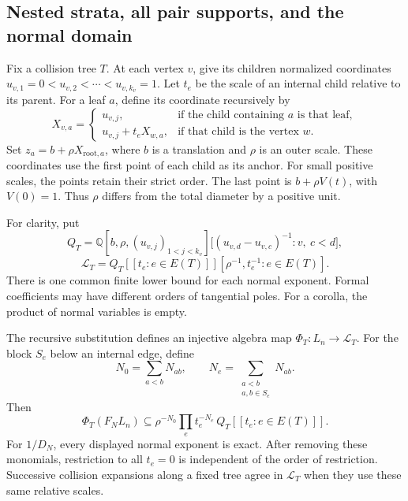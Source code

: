 \subsection{Nested strata, all pair supports, and the normal domain}
\label{gf:sec:gf-nested}

Fix a collision tree \(T\).  At each vertex \(v\), give its
children normalized coordinates
\(u_{v,1}=0<u_{v,2}<\cdots<u_{v,k_v}=1\).
Let \(t_e\) be the scale of an internal child relative to its parent.
For a leaf \(a\), define its coordinate recursively by
\[
 X_{v,a}=
 \begin{cases}
 u_{v,j},&\text{if the child containing }a\text{ is that leaf},\\
 u_{v,j}+t_eX_{w,a},&\text{if that child is the vertex }w.
 \end{cases}
\]
Set \(z_a=b+\rho X_{\mathrm{root},a}\), where \(b\) is a
translation and \(\rho\) is an outer scale.
These coordinates use the first point of each child as its anchor.
For small positive scales, the points retain their strict order.
The last point is \(b+\rho V(t)\), with \(V(0)=1\).
Thus \(\rho\) differs from the total diameter by a positive unit.

For clarity, put
\[
 Q_T=\mathbb Q[b,\rho,(u_{v,j})_{1<j<k_v}]
 \bigl[(u_{v,d}-u_{v,c})^{-1}:v,\ c<d\bigr],
\]
\begin{equation}\label{gf:eq:gf-domain}
 \mathscr L_T=
 Q_T[[t_e:e\in E(T)]][\rho^{-1},t_e^{-1}:e\in E(T)].
\end{equation}
There is one common finite lower bound for each normal exponent.
Formal coefficients may have different orders of tangential poles.
For a corolla, the product of normal variables is empty.

\begin{theorem}\label{gf:thm:gf-nested-poles}
The recursive substitution defines an injective algebra map
\(\Phi_T:L_n\to\mathscr L_T\).
For the block \(S_e\) below an internal edge, define
\[
 N_0=\sum_{a<b}N_{ab},\qquad
 N_e=\sum_{\substack{a<b\\a,b\in S_e}}N_{ab}.
\]
Then
\begin{equation}\label{gf:eq:gf-pole-bound}
 \Phi_T(F_NL_n)\subseteq
 \rho^{-N_0}\prod_e t_e^{-N_e}\,
 Q_T[[t_e:e\in E(T)]].
\end{equation}
For \(1/D_N\), every displayed normal exponent is exact.
After removing these monomials, restriction to all \(t_e=0\)
is independent of the order of restriction.
Successive collision expansions along a fixed tree agree in
\(\mathscr L_T\) when they use these same relative scales.
\end{theorem}

